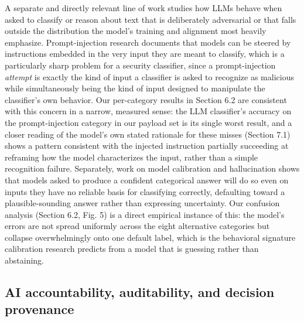 \documentclass[journal,10pt,twocolumn]{IEEEtran}
\begin{document}
A separate and directly relevant line of work studies how LLMs behave when asked to classify or reason about text that is deliberately adversarial or that falls outside the distribution the model's training and alignment most heavily emphasize. Prompt-injection research documents that models can be steered by instructions embedded in the very input they are meant to classify, which is a particularly sharp problem for a security classifier, since a prompt-injection \emph{attempt} is exactly the kind of input a classifier is asked to recognize as malicious while simultaneously being the kind of input designed to manipulate the classifier's own behavior. Our per-category results in Section 6.2 are consistent with this concern in a narrow, measured sense: the LLM classifier's accuracy on the prompt-injection category in our payload set is its single worst result, and a closer reading of the model's own stated rationale for these misses (Section 7.1) shows a pattern consistent with the injected instruction partially succeeding at reframing how the model characterizes the input, rather than a simple recognition failure. Separately, work on model calibration and hallucination shows that models asked to produce a confident categorical answer will do so even on inputs they have no reliable basis for classifying correctly, defaulting toward a plausible-sounding answer rather than expressing uncertainty. Our confusion analysis (Section 6.2, Fig. 5) is a direct empirical instance of this: the model's errors are not spread uniformly across the eight alternative categories but collapse overwhelmingly onto one default label, which is the behavioral signature calibration research predicts from a model that is guessing rather than abstaining.

\subsection{AI accountability, auditability, and decision provenance}
\end{document}

